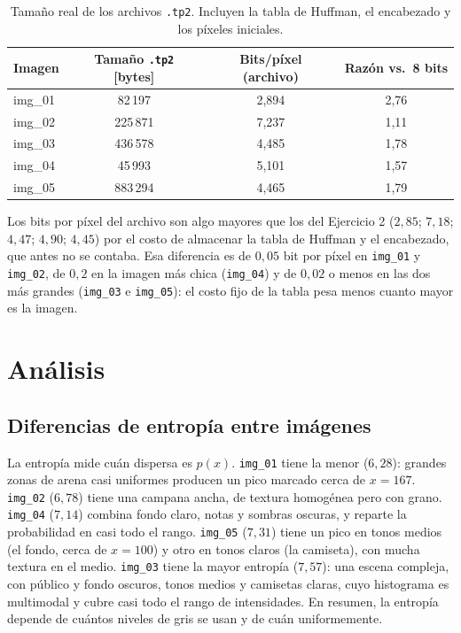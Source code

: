 \documentclass[11pt,a4paper]{article}
\begin{document}
\begin{table}[H]
\centering
\begin{tabular}{lccc}
\toprule
Imagen & Tamaño \texttt{.tp2} [bytes] & Bits/píxel (archivo) & Razón vs.\ 8 bits \\
\midrule
img\_01 & 82\,197 & 2,894 & 2,76 \\
img\_02 & 225\,871 & 7,237 & 1,11 \\
img\_03 & 436\,578 & 4,485 & 1,78 \\
img\_04 & 45\,993 & 5,101 & 1,57 \\
img\_05 & 883\,294 & 4,465 & 1,79 \\
\bottomrule
\end{tabular}
\caption{Tamaño real de los archivos \texttt{.tp2}. Incluyen la tabla de Huffman, el encabezado y los píxeles iniciales.}
\end{table}

Los bits por píxel del archivo son algo mayores que los del Ejercicio 2 ($2{,}85$; $7{,}18$; $4{,}47$; $4{,}90$; $4{,}45$) por el costo de almacenar la tabla de Huffman y el encabezado, que antes no se contaba. Esa diferencia es de $0{,}05$ bit por píxel en \texttt{img\_01} y \texttt{img\_02}, de $0{,}2$ en la imagen más chica (\texttt{img\_04}) y de $0{,}02$ o menos en las dos más grandes (\texttt{img\_03} e \texttt{img\_05}): el costo fijo de la tabla pesa menos cuanto mayor es la imagen.

\section{Análisis}
\subsection{Diferencias de entropía entre imágenes}
La entropía mide cuán dispersa es $p(x)$. \texttt{img\_01} tiene la menor ($6{,}28$): grandes zonas de arena casi uniformes producen un pico marcado cerca de $x=167$. \texttt{img\_02} ($6{,}78$) tiene una campana ancha, de textura homogénea pero con grano. \texttt{img\_04} ($7{,}14$) combina fondo claro, notas y sombras oscuras, y reparte la probabilidad en casi todo el rango. \texttt{img\_05} ($7{,}31$) tiene un pico en tonos medios (el fondo, cerca de $x=100$) y otro en tonos claros (la camiseta), con mucha textura en el medio. \texttt{img\_03} tiene la mayor entropía ($7{,}57$): una escena compleja, con público y fondo oscuros, tonos medios y camisetas claras, cuyo histograma es multimodal y cubre casi todo el rango de intensidades. En resumen, la entropía depende de cuántos niveles de gris se usan y de cuán uniformemente.
\end{document}
